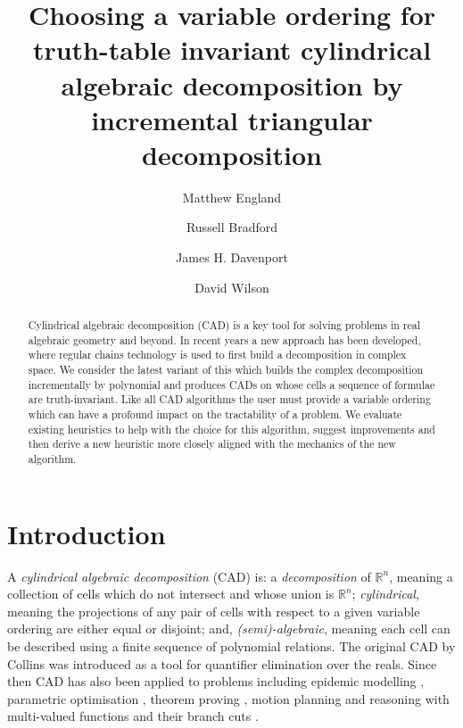 \documentclass[runningheads,a4paper]{llncs}
\newcommand{\R}{\mathbb{R}}
\begin{document}
\mainmatter



\title{Choosing a variable ordering for truth-table invariant cylindrical algebraic decomposition by incremental triangular decomposition}   \author{Matthew England \and  Russell Bradford \and James H. Davenport \and David Wilson}
\maketitle



\begin{abstract}


Cylindrical algebraic decomposition (CAD) is a key tool for solving problems in real algebraic geometry and beyond.  In recent years a new approach has been developed, where regular chains technology is used to first build a decomposition in complex space.
We consider the latest variant of this which builds the complex decomposition incrementally by polynomial and produces CADs on whose cells a sequence of formulae are truth-invariant.  
Like all CAD algorithms the user must provide a variable ordering which can have a profound impact on the tractability of a problem.  We evaluate existing heuristics to help with the choice for this algorithm, suggest  improvements and then derive a new heuristic more closely aligned with the mechanics of the new algorithm.
\end{abstract}


\section{Introduction} 
\label{SEC:Intro}

A \textit{cylindrical algebraic decomposition} (CAD) is: a \textit{decomposition} of $\R^n$, meaning a collection of cells which do not intersect and whose union is $\R^n$; \textit{cylindrical}, meaning the projections of any pair of cells with respect to a given variable ordering are either equal or disjoint; and, \textit{(semi)-algebraic}, meaning each cell can be described using a finite sequence of polynomial relations.
The original CAD by Collins \cite{ACM84I} was introduced as a tool for quantifier elimination over the reals.  Since then CAD has also been applied to problems including epidemic modelling \cite{BENW06}, parametric optimisation \cite{FPM05}, theorem proving \cite{Paulson2012}, motion planning \cite{WDEB14} and reasoning with multi-valued functions and their branch cuts \cite{DBEW12}.
\end{document}
